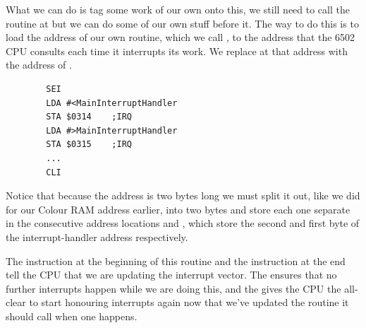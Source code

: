 What we can do is tag some work of our own onto this, we still need to call the routine at  but we can do some of our
own stuff before it. The way to do this is to load the address of our own routine, which we call , to
the address that the 6502 CPU consults each time it interrupts its work. We replace  at that address with the address
of .  
\begin{lstlisting}
        SEI 
        LDA #<MainInterruptHandler
        STA $0314    ;IRQ
        LDA #>MainInterruptHandler
        STA $0315    ;IRQ
        ...
        CLI 
\end{lstlisting}

Notice that because the address is two bytes long we must split it out, like we did for our Colour RAM address earlier, into 
two bytes and store each one separate in the consecutive address locations  and , which store
the second and first byte of the interrupt-handler address respectively. 

The  instruction at the beginning of this routine and the  instruction at the end tell the CPU that we 
are updating the interrupt vector. The  ensures that no further interrupts happen while we are doing this, and the
 gives the CPU the all-clear to start honouring interrupts again now that we've updated the routine it should call
when one happens.


